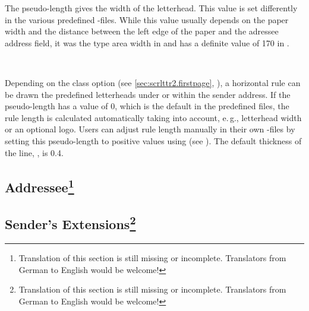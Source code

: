 \begin{Declaration}
\end{Declaration}
%
The pseudo-length  gives the width of the
letterhead. This value is set differently in the various predefined
-files.
While this value usually depends on the paper width and the distance between
the left edge of the paper and the adressee address field, it was the type
area width in  and has a definite value of 170 in
.%
%
%


\begin{Declaration}
  \\
\end{Declaration}
%
%
Depending on the class option  (see
\autoref{sec:scrlttr2.firstpage},
), a horizontal rule can be drawn
the predefined letterheads under or within the sender
address. If the pseudo-length  has
a value of 0, which is the default in the predefined 
files, the rule length is calculated automatically taking into account,
e.\,g., letterhead width or an optional logo. Users can adjust rule length
manually in their own -files by setting this pseudo-length to
positive values using \Macro{\@setplength} (see
). The default thickness of
the line, , is
0.4.%
%
%
%
%
%


\subsection{Addressee\protect\footnote{Translation of
    this section is still missing or incomplete. Translators from German to
    English would be welcome!}}
\label{sec:scrlttr2-experts.addressee}%

\mbox{}%

\subsection{Sender's Extensions\protect\footnote{Translation of
    this section is still missing or incomplete. Translators from German to
    English would be welcome!}}
\label{sec:scrlttr2-experts.locationField}

